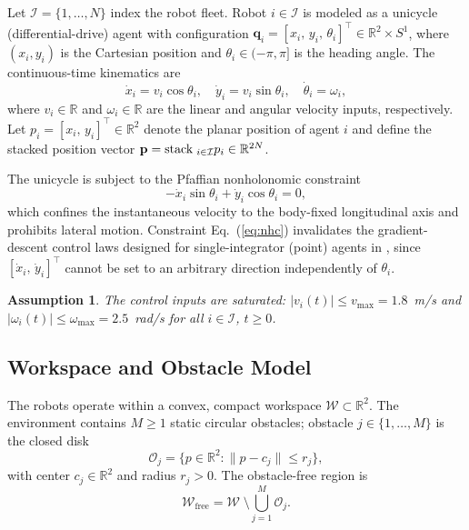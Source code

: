 \documentclass[letterpaper, 10 pt, journal, twoside]{IEEEtran}
\newcommand{\stack}{{\rm stack\;}}
\newcommand{\R}{\mathbb{R}}
\newtheorem{assumption}{Assumption}
\def\scr#1{{\mathcal #1}}
\newcommand{\eqnref}[1]{Eq.~(\ref{#1})}
\begin{document}
Let $\scr{I}=\{1,\ldots,N\}$ index the robot fleet.  Robot $i\in\scr{I}$ is
modeled as a unicycle (differential-drive) agent with configuration
$\mathbf{q}_{i}=[x_{i},\,y_{i},\,\theta_{i}]^{\top}\in\R^{2}\times S^{1}$,
where $(x_{i},y_{i})$ is the Cartesian position and
$\theta_{i}\in(-\pi,\pi]$ is the heading angle.  The continuous-time kinematics
are
\begin{equation}
  \dot{x}_{i}=v_{i}\cos\theta_{i}, \quad
  \dot{y}_{i}=v_{i}\sin\theta_{i}, \quad
  \dot{\theta}_{i}=\omega_{i},
  \label{eq:unicycle}
\end{equation}
where $v_{i}\in\R$ and $\omega_{i}\in\R$ are the linear and angular velocity
inputs, respectively.  Let $p_{i}=[x_{i},\,y_{i}]^{\top}\in\R^{2}$ denote the
planar position of agent $i$ and define the stacked position vector
$\mathbf{p}=\stack_{i\in\scr{I}}p_{i}\in\R^{2N}$.

The unicycle is subject to the Pfaffian nonholonomic constraint
\begin{equation}
  -\dot{x}_{i}\sin\theta_{i}+\dot{y}_{i}\cos\theta_{i}=0,
  \label{eq:nhc}
\end{equation}
which confines the instantaneous velocity to the body-fixed longitudinal axis
and prohibits lateral motion.  Constraint \eqnref{eq:nhc} invalidates the
gradient-descent control laws designed for single-integrator (point) agents
in \cite{kan2012ITAC}, since $[\dot{x}_{i},\,\dot{y}_{i}]^{\top}$ cannot be
set to an arbitrary direction independently of $\theta_{i}$.

\begin{assumption}
\label{asm:bounds}
The control inputs are saturated: $|v_{i}(t)|\leq v_{\max}=1.8$~m/s and
$|\omega_{i}(t)|\leq\omega_{\max}=2.5$~rad/s for all $i\in\scr{I}$, $t\geq 0$.
\end{assumption}

\subsection{Workspace and Obstacle Model}

The robots operate within a convex, compact workspace
$\scr{W}\subset\R^{2}$.  The environment contains $M\geq 1$ static circular
obstacles; obstacle $j\in\{1,\ldots,M\}$ is the closed disk
\begin{equation}
  \scr{O}_{j}=\bigl\{p\in\R^{2}:\|p-c_{j}\|\leq r_{j}\bigr\},
  \label{eq:obstacle}
\end{equation}
with center $c_{j}\in\R^{2}$ and radius $r_{j}>0$.  The obstacle-free region is
\begin{equation}
  \scr{W}_{\mathrm{free}}=\scr{W}\;\setminus\!\bigcup_{j=1}^{M}\scr{O}_{j}.
  \label{eq:wfree}
\end{equation}
\end{document}
